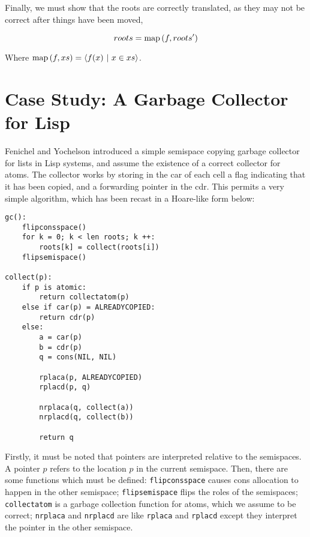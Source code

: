 Finally, we must show that the roots are correctly translated, as they
may not be correct after things have been moved,

\begin{definition}
  \label{def:c-root-translation}
  \[roots = \mathrm{map}\left(f, roots'\right)\]

  Where $\mathrm{map}\left(f, xs\right) = \langle f(x)~|~x \in xs \rangle$.
\end{definition}

\section{Case Study: A Garbage Collector for Lisp}
\label{sec:copying-example}

Fenichel and Yochelson\cite{Fenichel69} introduced a simple semispace
copying garbage collector for lists in Lisp systems, and assume the
existence of a correct collector for atoms. The collector works by
storing in the car of each cell a flag indicating that it has been
copied, and a forwarding pointer in the cdr. This permits a very
simple algorithm, which has been recast in a Hoare-like form below:

\begin{lstlisting}
gc():
    flipconsspace()
    for k = 0; k < len roots; k ++:
        roots[k] = collect(roots[i])
    flipsemispace()

collect(p):
    if p is atomic:
        return collectatom(p)
    else if car(p) = ALREADYCOPIED:
        return cdr(p)
    else:
        a = car(p)
        b = cdr(p)
        q = cons(NIL, NIL)

        rplaca(p, ALREADYCOPIED)
        rplacd(p, q)

        nrplaca(q, collect(a))
        nrplacd(q, collect(b))

        return q
\end{lstlisting}

Firstly, it must be noted that pointers are interpreted relative to
the semispaces. A pointer $p$ refers to the location $p$ in the
current semispace. Then, there are some functions which must be
defined: \texttt{flipconsspace} causes cons allocation to happen in
the other semispace; \texttt{flipsemispace} flips the roles of the
semispaces; \texttt{collectatom} is a garbage collection function for
atoms, which we assume to be correct; \texttt{nrplaca} and
\texttt{nrplacd} are like \texttt{rplaca} and \texttt{rplacd} except
they interpret the pointer in the other semispace.

